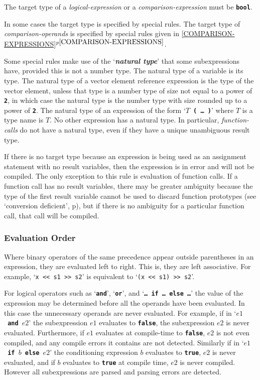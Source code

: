 \documentclass[12pt]{article}
\newcommand{\TT}[1]{{\tt \bfseries #1}}
\newcommand{\key}[1]{{\bf \em #1}\index{#1}}
\newcommand{\itemref}[1]{\ref{#1}$^{p\pageref{#1}}$}
\newcommand{\pagref}[1]{p\pageref{#1}}
\begin{document}
The target type of a {\em logical-expression} or a {\em comparison-expression}
must be \TT{bool}.

In some cases the target type is specified by special rules.  The
target type of {\em comparison-operands} is specified by special
rules given in \itemref{COMPARISON-EXPRESSIONS}.

Some special rules
make use of the `\key{natural type}'\label{NATURAL-TYPE}
that some subexpressions have, provided this is not a number type.
The natural type of a variable is its type.  The natural
type of a vector element reference expression is the type of the
vector element, unless that type is a number type of size not
equal to a power of \TT{2}, in which case the natural type is
the number type with size rounded up to a power of \TT{2}.
The natural type of an expression of the
form `\TT{$T$ ( \ldots{} )}' where $T$ is a type name is $T$.
No other expression has a natural type.  In particular,
{\em function-calls} do not have a natural type, even if
they have a unique unambiguous result type.

If there is no target type because an expression is being used
as an assignment statement with no result variables, then
the expression is in error and will not be compiled.
The only exception to this rule
is evaluation of function calls.  If a function call has no
result variables, there may be greater ambiguity because the
type of the first result variable cannot be used to discard function
prototypes (see `conversion deficient', \pagref{CONVERSION-DEFICIENT}),
but if there is no ambiguity for a particular
function call, that call will be compiled.

\subsubsection{Evaluation Order}
\label{EVALUATION-ORDER}

Where binary operators of the same precedence appear outside
parentheses in an expression, they are evaluated left to right.
This is, they are left associative.  For example,
`{\tt x <{}< s1 >{}> s2}' is
equivalent to `{\tt (x <{}< s1) >{}> s2}'.

For logical operators such as `\TT{and}', `\TT{or}', and
`\TT{\ldots{}~if~\ldots{}~else~\ldots{}}' the value of the expression
may be determined before all the operands have been evaluated.
In this case the unnecessary operands are never evaluated.
For example, if in `\TT{$e1$~and~$e2$}' the subexpression $e1$
evaluates to \TT{false}, the subexpression $e2$ is never evaluated.
Furthermore, if $e1$ evaluates at compile-time to \TT{false},
$e2$ is not even compiled, and any compile errors it contains
are not detected.  Similarly if in `\TT{$e1$~if~$b$~else~$e2$}' the
conditioning expression $b$ evaluates to \TT{true}, $e2$ is
never evaluated, and if $b$ evaluates to \TT{true} at compile
time, $e2$ is never compiled.  However all subexpressions are parsed and
parsing errors are detected.
\end{document}
